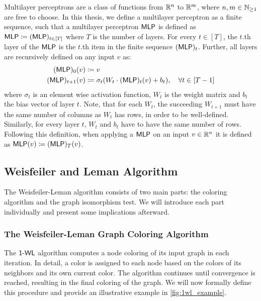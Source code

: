 \begin{definition}\label{def:mlp}
    Multilayer perceptrons are a class of functions from $\mathbb{R}^n$ to $\mathbb{R}^m$, where $n,m \in \mathbb{N}_{\geq 1}$ are free to choose. In this thesis, we define a multilayer perceptron as a finite sequence, such that a multilayer perceptron $\textsf{MLP}$ is defined as $\textsf{MLP} \coloneqq (\textsf{MLP})_{t\in[T]}$ where $T$ is the number of layers. For every $t \in [T]$, the $t$.th layer of the $\textsf{MLP}$ is the $t$.th item in the finite sequence $(\textsf{MLP})_t$. Further, all layers are recursively defined on any input $v$ as:
    \begin{align*}
        (\textsf{MLP})_{0}(v) &\coloneqq v\\
        (\textsf{MLP})_{t+1}(v) &\coloneqq \sigma_t(W_t \cdot (\textsf{MLP})_{t} (v) + b_t), \quad \forall t \in [T-1]
    \end{align*}
    where $\sigma_t$ is an element wise activation function, $W_t$ is the weight matrix and $b_t$ the bias vector of layer $t$. Note, that for each $W_t$, the succeeding $W_{t+1}$ must have the same number of columns as $W_t$ has rows, in order to be well-defined. Similarly, for every layer $t$, $W_t$ and $b_t$ have to have the same number of rows.
    Following this definition, when applying a $\textsf{MLP}$ on an input $v \in \mathbb{R}^n$ it is defined as $\textsf{MLP}(v) \coloneqq (\textsf{MLP})_T(v)$.
\end{definition}

\subsection{Weisfeiler and Leman Algorithm}\label{sec:1-WL Definition}
The Weisfeiler-Leman algorithm consists of two main parts: the coloring algorithm and the graph isomorphism test. We will introduce each part individually and present some implications afterward.

\subsubsection{The Weisfeiler-Leman Graph Coloring Algorithm}
The $\textsf{1-WL}$ algorithm computes a node coloring of its input graph in each iteration. In detail, a color is assigned to each node based on the colors of its neighbors and its own current color. The algorithm continues until convergence is reached, resulting in the final coloring of the graph. We will now formally define this procedure and provide an illustrative example in \cref{fig:1wl_example}.

